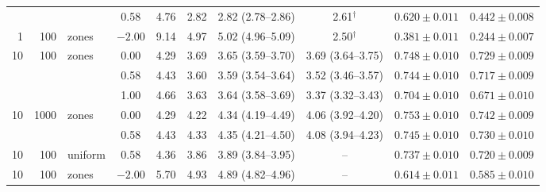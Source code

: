 \begin{table}[tbp]
\begin{tabular}{@{}rrlccccccc@{}}
     &  &  & 0.58 & 4.76 & 2.82 & 2.82 (2.78--2.86) & 2.61$^{\dagger}$ & $0.620\pm0.011$ & $0.442\pm0.008$ \\
    1 & 100 & zones & $-2.00$ & 9.14 & 4.97 & 5.02 (4.96--5.09) & 2.50$^{\dagger}$ & $0.381\pm0.011$ & $0.244\pm0.007$ \\
    \midrule
    10 & 100 & zones & 0.00 & 4.29 & 3.69 & 3.65 (3.59--3.70) & 3.69 (3.64--3.75) & $0.748\pm0.010$ & $0.729\pm0.009$ \\
     &  &  & 0.58 & 4.43 & 3.60 & 3.59 (3.54--3.64) & 3.52 (3.46--3.57) & $0.744\pm0.010$ & $0.717\pm0.009$ \\
     &  &  & 1.00 & 4.66 & 3.63 & 3.64 (3.58--3.69) & 3.37 (3.32--3.43) & $0.704\pm0.010$ & $0.671\pm0.010$ \\
    10 & 1000 & zones & 0.00 & 4.29 & 4.22 & 4.34 (4.19--4.49) & 4.06 (3.92--4.20) & $0.753\pm0.010$ & $0.742\pm0.009$ \\
     &  &  & 0.58 & 4.43 & 4.33 & 4.35 (4.21--4.50) & 4.08 (3.94--4.23) & $0.745\pm0.010$ & $0.730\pm0.010$ \\
    10 & 100 & uniform & 0.58 & 4.36 & 3.86 & 3.89 (3.84--3.95) & -- & $0.737\pm0.010$ & $0.720\pm0.009$ \\
    10 & 100 & zones & $-2.00$ & 5.70 & 4.93 & 4.89 (4.82--4.96) & -- & $0.614\pm0.011$ & $0.585\pm0.010$ \\
    \bottomrule
  \end{tabular}
\end{table}


